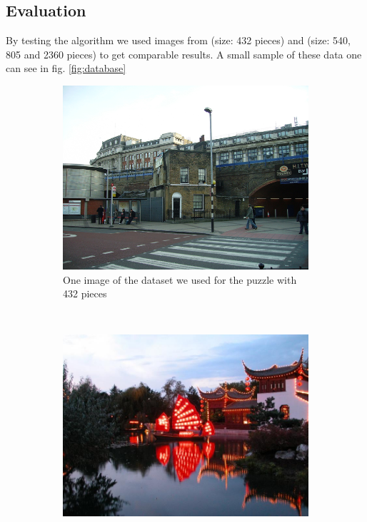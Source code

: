 \documentclass[11pt]{report}
\begin{document}
\subsection{Evaluation}
By testing the algorithm we used images from \cite{Cho2010} (size: 432 pieces) and \cite{Pomeranz2011} (size: 540, 805 and 2360 pieces) to get comparable results. A small sample of these data one can see in fig. \ref{fig:database}

\begin{figure}
	\centering
	\begin{subfigure}[b]{0.45\textwidth}
		\includegraphics[width=\textwidth]{../imData/432/1.png}
		\caption{One image of the dataset we used for the puzzle with 432 pieces}
		\label{img:432}
	\end{subfigure}
	~
	\begin{subfigure}[b]{0.45\textwidth}
		\includegraphics[width=\textwidth]{../imData/540/1.jpg}

\end{subfigure}
\end{figure}
\end{document}
